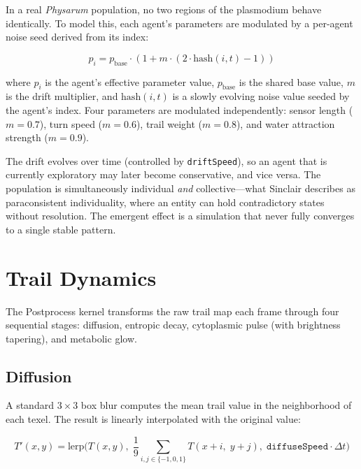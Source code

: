\documentclass[12pt, titlepage]{article}
\begin{document}
In a real \textit{Physarum} population, no two regions of the plasmodium behave
identically. To model this, each agent's parameters are modulated by a
per-agent noise seed derived from its index:

\begin{equation}
    p_i = p_{\text{base}} \cdot (1 + m \cdot (2 \cdot \text{hash}(i, t) - 1))
\end{equation}

where $p_i$ is the agent's effective parameter value, $p_{\text{base}}$ is the
shared base value, $m$ is the drift multiplier, and $\text{hash}(i, t)$ is a
slowly evolving noise value seeded by the agent's index. Four parameters are
modulated independently: sensor length ($m = 0.7$), turn speed ($m = 0.6$),
trail weight ($m = 0.8$), and water attraction strength ($m = 0.9$).

The drift evolves over time (controlled by \texttt{driftSpeed}), so an agent
that is currently exploratory may later become conservative, and vice versa.
The population is simultaneously individual \textit{and} collective---what
Sinclair \cite{sinclair2020} describes as paraconsistent individuality, where
an entity can hold contradictory states without resolution. The emergent effect
is a simulation that never fully converges to a single stable pattern.

\section{Trail Dynamics}
\label{sec:trails}

The Postprocess kernel transforms the raw trail map each frame through four
sequential stages: diffusion, entropic decay, cytoplasmic pulse (with
brightness tapering), and metabolic glow.

\subsection{Diffusion}

A standard $3 \times 3$ box blur computes the mean trail value in the
neighborhood of each texel. The result is linearly interpolated with the
original value:

\begin{equation}
    T'(x,y) = \text{lerp}\Big(T(x,y),\;\frac{1}{9}\sum_{i,j \in
    \{-1,0,1\}} T(x+i,\; y+j),\;\texttt{diffuseSpeed} \cdot \Delta t\Big)
\end{equation}
\end{document}
